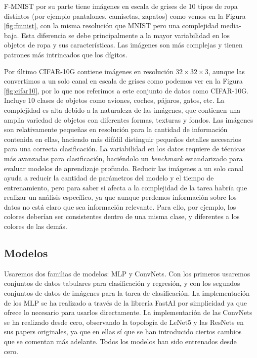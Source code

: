 F-MNIST por su parte tiene imágenes en escala de grises de 10 tipos de ropa distintos (por ejemplo pantalones, camisetas, zapatos) como vemos en la Figura \ref{fig:fmnist}, con la misma resolución que MNIST pero una complejidad media-baja. Esta diferencia se debe principalmente a la mayor variabilidad en los objetos de ropa y sus características. Las imágenes son más complejas y tienen patrones más intrincados que los dígitos.


Por último CIFAR-10G contiene imágenes en resolución $32 \times 32 \times 3$, aunque las convertimos a un solo canal en escala de grises como podemos ver en la Figura \ref{fig:cifar10}, por lo que nos referimos a este conjunto de datos como CIFAR-10G. Incluye 10 clases de objetos como aviones, coches, pájaros, gatos, etc. La complejidad es alta debido a la naturaleza de las imágenes, que contienen una amplia variedad de objetos con diferentes formas, texturas y fondos. Las imágenes son relativamente pequeñas en resolución para la cantidad de información contenida en ellas, haciendo más difídil distinguir pequeños detalles necesarios para una correcta clasificación. La variabilidad en los datos requiere de técnicas más avanzadas para clasificación, haciéndolo un \textit{benchmark} estandarizado para evaluar modelos de aprendizaje profundo. Reducir las imágenes a un solo canal ayuda a reducir la cantidad de parámetros del modelo y el tiempo de entrenamiento, pero para saber si afecta a la complejidad de la tarea habría que realizar un análisis específico, ya que aunque perdemos información sobre los datos no está claro que sea información relevante. Para ello, por ejemplo, los colores deberían ser consistentes dentro de una misma clase, y diferentes a los colores de las demás.












\subsection{Modelos}
\label{sec:modelos}

Usaremos dos familias de modelos: MLP y ConvNets. Con los primeros usaremos conjuntos de datos tabulares para clasificación y regresión, y con los segundos conjuntos de datos de imágenes para la tarea de clasificación. La implementación de los MLP se ha realizado a través de la librería FastAI por simplicidad ya que ofrece lo necesario para usarlos directamente. La implementación de las ConvNets se ha realizado desde cero, observando la topología de LeNet5 y las ResNets en sus papers originales, ya que en ellas sí que se han introducido ciertos cambios que se comentan más adelante. Todos los modelos han sido entrenados desde cero.

